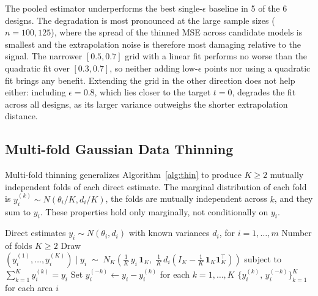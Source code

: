\documentclass[11pt]{article}
\newcommand{\N}[2]{N\!\left(#1, #2\right)}
\theoremstyle{plain}
\theoremstyle{definition}
\theoremstyle{remark}
\begin{document}
The pooled estimator underperforms the best single-$\epsilon$ baseline in 5 of the 6 designs. The degradation is most pronounced at the large sample sizes ($n = 100, 125$), where the spread of the thinned MSE across candidate models is smallest and the extrapolation noise is therefore most damaging relative to the signal. The narrower $[0.5, 0.7]$ grid with a linear fit performs no worse than the quadratic fit over $[0.3, 0.7]$, so neither adding low-$\epsilon$ points nor using a quadratic fit brings any benefit. Extending the grid in the other direction does not help either: including $\epsilon = 0.8$, which lies closer to the target $t = 0$, degrades the fit across all designs, as its larger variance outweighs the shorter extrapolation distance.


\subsection{Multi-fold Gaussian Data Thinning}\label{app:multifold}

Multi-fold thinning generalizes Algorithm~\ref{alg:thin} to produce $K \geq 2$ mutually independent folds of each direct estimate. The marginal distribution of each fold is $y_i^{(k)} \sim \N{\theta_i/K}{d_i/K}$, the folds are mutually independent across $k$, and they sum to $y_i$. These properties hold only marginally, not conditionally on $y_i$.

\begin{algorithm}[H]
\caption{Multi-fold Gaussian Data Thinning (equal folds; based on Algorithm~2 and Example~5 of \citealt{neufeld_data_2024})}\label{alg:multifold}
\begin{algorithmic}[1]
\Require Direct estimates $y_i \sim \N{\theta_i}{d_i}$ with known variances $d_i$, for $i = 1, \ldots, m$
\Require Number of folds $K \geq 2$
  \State Draw $(y_i^{(1)}, \ldots, y_i^{(K)}) \mid y_i \;\sim\; N_{K}\!\left(\frac{1}{K}\, y_i\,\mathbf{1}_{K},\; \frac{1}{K}\, d_i\!\left(I_{K} - \frac{1}{K}\,\mathbf{1}_{K}\mathbf{1}_{K}^\top\right)\right)$
  \Statex \hspace{2.5em} subject to $\textstyle\sum_{k=1}^K y_i^{(k)} = y_i$
  \State Set $y_i^{(-k)} \leftarrow y_i - y_i^{(k)}$ for each $k = 1, \ldots, K$
\EndFor
\State \Return $\bigl\{y_i^{(k)},\, y_i^{(-k)}\bigr\}_{k=1}^{K}$ for each area $i$
\end{algorithmic}
\end{algorithm}
\end{document}
